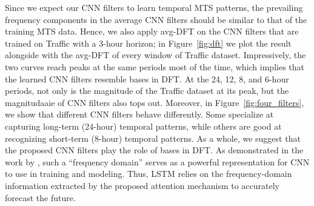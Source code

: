 Since we expect our CNN filters to learn temporal MTS patterns, the prevailing frequency components in the average CNN filters should be similar to that of the training MTS data.
Hence, we also apply avg-DFT on the  CNN filters that are trained on Traffic with a 3-hour horizon; in Figure~\ref{fig:dft} we plot the result alongside with the avg-DFT of every window of Traffic dataset.
Impressively, the two curves reach peaks at the same periods most of the time, which implies that the learned CNN filters resemble bases in DFT.
At the 24, 12, 8, and 6-hour periods, not only is the magnitude of the Traffic dataset at its peak, but the magnitudaaie of CNN filters also tops out. 
Moreover, in Figure~\ref{fig:four_filters}, we show that different CNN filters behave differently.
Some specialize at capturing long-term (24-hour) temporal patterns, while others are good at recognizing short-term (8-hour) temporal patterns.
As a whole, we suggest that the proposed CNN filters play the role of bases in DFT.
As demonstrated in the work by \cite{spectral_CNN}, such a ``frequency domain'' serves as a powerful representation for CNN to use in training and modeling.
Thus, LSTM relies on the frequency-domain information extracted by the proposed attention mechanism to accurately forecast the future.

